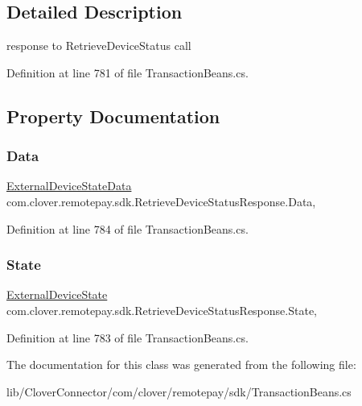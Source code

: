 \subsection{Detailed Description}
response to Retrieve\+Device\+Status call 



Definition at line 781 of file Transaction\+Beans.\+cs.



\subsection{Property Documentation}
\mbox{\label{classcom_1_1clover_1_1remotepay_1_1sdk_1_1_retrieve_device_status_response_ade87936ceacda060e9cf0eff839feccb}} 
\subsubsection{\texorpdfstring{Data}{Data}}
{\footnotesize\ttfamily \hyperlink{classcom_1_1clover_1_1remotepay_1_1sdk_1_1_external_device_state_data}{External\+Device\+State\+Data} com.\+clover.\+remotepay.\+sdk.\+Retrieve\+Device\+Status\+Response.\+Data\hspace{0.3cm}{\ttfamily [get]}, {\ttfamily [set]}}



Definition at line 784 of file Transaction\+Beans.\+cs.

\mbox{\label{classcom_1_1clover_1_1remotepay_1_1sdk_1_1_retrieve_device_status_response_a9e4bc4a0a7fa8c32d6201d6749589212}} 
\subsubsection{\texorpdfstring{State}{State}}
{\footnotesize\ttfamily \hyperlink{namespacecom_1_1clover_1_1remotepay_1_1sdk_a9d5838a91e2711306ad561d104fed034}{External\+Device\+State} com.\+clover.\+remotepay.\+sdk.\+Retrieve\+Device\+Status\+Response.\+State\hspace{0.3cm}{\ttfamily [get]}, {\ttfamily [set]}}



Definition at line 783 of file Transaction\+Beans.\+cs.



The documentation for this class was generated from the following file\+:\begin{DoxyCompactItemize}
\item 
lib/\+Clover\+Connector/com/clover/remotepay/sdk/Transaction\+Beans.\+cs\end{DoxyCompactItemize}

